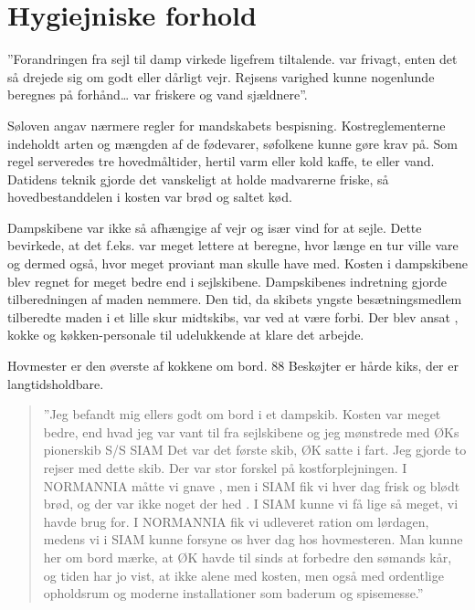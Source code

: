 \chapter{Hygiejniske forhold}\label{hygiejniske-forhold}

''Forandringen fra sejl til damp virkede ligefrem tiltalende.
 var frivagt, enten det så drejede sig om godt eller
dårligt vejr.  Rejsens varighed kunne nogenlunde beregnes på
forhånd\ldots{}  var friskere og vand sjældnere''.

Søloven angav nærmere regler for mandskabets bespisning.
Kostreglementerne indeholdt arten og mængden af de fødevarer, søfolkene
kunne gøre krav på. Som regel serveredes tre hovedmåltider, hertil varm
eller kold kaffe, te eller vand. Datidens teknik gjorde det vanskeligt at
holde madvarerne friske, så hovedbestanddelen i kosten var brød og saltet
kød. 

Dampskibene var ikke så afhængige af vejr og især vind for at sejle.
Dette bevirkede, at det f.eks. var meget lettere at beregne, hvor længe
en tur ville vare og dermed også, hvor meget proviant man skulle have
med. Kosten i dampskibene blev regnet for meget bedre end i sejlskibene.
Dampskibenes indretning gjorde tilberedningen af maden nemmere. Den tid,
da skibets yngste besætningsmedlem tilberedte maden i et lille skur
midtskibs, var ved at være forbi. Der blev ansat
, kokke og
køkken-personale til udelukkende at klare det arbejde. 

Hovmester er den øverste af kokkene om bord. 88
Beskøjter er hårde kiks, der er langtidsholdbare.

\begin{quote}
    
    ''Jeg befandt mig ellers godt om bord i et dampskib. Kosten var meget
    bedre, end hvad jeg var vant til fra sejlskibene og jeg mønstrede med
    ØKs pionerskib S/S SIAM Det var det første skib, ØK satte i fart. Jeg
    gjorde to rejser med dette skib. Der var stor forskel på
    kostforplejningen. I NORMANNIA måtte vi gnave
    ,
    men i SIAM fik vi hver dag frisk og blødt brød, og der var ikke noget
    der hed . I SIAM kunne vi få lige så meget, vi havde
    brug for.  I NORMANNIA fik vi udleveret ration om lørdagen, medens vi
    i SIAM kunne forsyne os hver dag hos hovmesteren. Man kunne her om
    bord mærke, at ØK havde til sinds at forbedre den
    sømands kår, og tiden har jo vist, at ikke alene med kosten, men også
    med ordentlige opholdsrum og moderne installationer som baderum og
    spisemesse.''

\end{quote}

